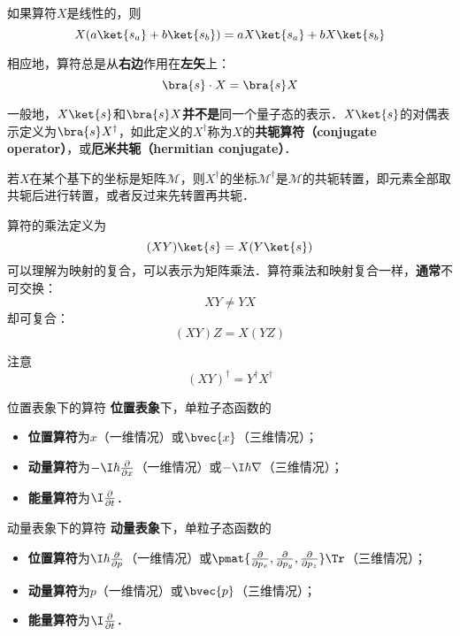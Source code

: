 如果算符$X$是线性的，则
\begin{equation}
X(a\ket{s_a}+b\ket{s_b}) = aX\ket{s_a}+bX\ket{s_b}
\end{equation}

相应地，算符总是从\textbf{右边}作用在\textbf{左矢}上：
\begin{equation}
\bra{s}\cdot X = \bra{s}X
\end{equation}

一般地，$X\ket{s}$和$\bra{s}X$\textbf{并不是}同一个量子态的表示．$X\ket{s}$的对偶表示定义为$\bra{s}X^\dagger$，如此定义的$X^\dagger$称为$X$的\textbf{共轭算符（conjugate operator）}，或\textbf{厄米共轭（hermitian conjugate）}．

若$X$在某个基下的坐标是矩阵$\mathcal{M}$，则$X^\dagger$的坐标$\mathcal{M}^\dagger$是$\mathcal{M}$的共轭转置，即元素全部取共轭后进行转置，或者反过来先转置再共轭．

算符的乘法定义为
\begin{equation}
(XY)\ket{s} = X(Y\ket{s})
\end{equation}
可以理解为映射的复合，可以表示为矩阵乘法．算符乘法和映射复合一样，\textbf{通常}不可交换：
\begin{equation}
XY\neq YX
\end{equation}
却可复合：
\begin{equation}
(XY)Z=X(YZ)
\end{equation}

注意
\begin{equation}
(XY)^\dagger = Y^\dagger X^\dagger
\end{equation}

\begin{example}{位置表象下的算符}
\textbf{位置表象}下，单粒子态函数的
\begin{itemize}
\item \textbf{位置算符}为$x$（一维情况）或$\bvec{x}$（三维情况）；
\item \textbf{动量算符}为$-\I\hbar\frac{\partial}{\partial x}$（一维情况）或$-\I\hbar\nabla$（三维情况）；
\item \textbf{能量算符}为$\I \frac{\partial}{\partial t}$．
\end{itemize}
\end{example}


\begin{example}{动量表象下的算符}
\textbf{动量表象}下，单粒子态函数的
\begin{itemize}
\item \textbf{位置算符}为$\I\hbar\frac{\partial}{\partial p}$（一维情况）或$\pmat{\frac{\partial}{\partial p_x}, \frac{\partial}{\partial p_y}, \frac{\partial}{\partial p_z}}\Tr$（三维情况）；
\item \textbf{动量算符}为$p$（一维情况）或$\bvec{p}$（三维情况）；
\item \textbf{能量算符}为$\I \frac{\partial}{\partial t}$．
\end{itemize}
\end{example}

